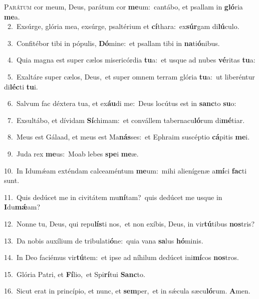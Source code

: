 \lettrine{\initial\textcolor{\initialcolor}{P}}{arátum} cor meum, Deus, parátum cor \textbf{me}\-um:~\star cantábo, et psallam in \textbf{gló}\-ria \textbf{me}\-a.\\
{\numbfont\textcolor{\numbcolor}{~2.}}~Exsúrge, glória mea, exsúrge, psaltérium et \textbf{cí}\-thara:~\star ex\-\textbf{súr}\-gam di\-\textbf{lú}\-culo.\par
{\numbfont\textcolor{\numbcolor}{~3.}}~Confitébor tibi in pópulis, \textbf{Dó}\-mine:~\star et psallam tibi in \textbf{na}\-ti\-\textbf{ó}\-nibus.\par
{\numbfont\textcolor{\numbcolor}{~4.}}~Quia magna est super cælos misericórdia \textbf{tu}\-a:~\star et usque ad nubes \textbf{vé}\-ritas \textbf{tu}\-a:\par
{\numbfont\textcolor{\numbcolor}{~5.}}~Exaltáre super cælos, Deus,~\dagger et super omnem terram glória \textbf{tu}\-a:~\star ut liberéntur di\-\textbf{léc}\-ti \textbf{tu}\-i.\par
{\numbfont\textcolor{\numbcolor}{~6.}}~Salvum fac déxtera tua, et ex\-\textbf{áu}\-di me:~\star Deus locútus est in \textbf{sanc}\-to \textbf{su}\-o:\par
{\numbfont\textcolor{\numbcolor}{~7.}}~Exsultábo, et dívidam \textbf{Sí}\-chimam:~\star et convállem tabernacu\-\textbf{ló}\-rum di\-\textbf{mé}\-tiar.\par
{\numbfont\textcolor{\numbcolor}{~8.}}~Meus est Gálaad, et meus est Ma\-\textbf{nás}\-ses:~\star et Ephraim suscéptio \textbf{cá}\-pitis \textbf{me}\-i.\par
{\numbfont\textcolor{\numbcolor}{~9.}}~Juda rex \textbf{me}\-us:~\star Moab lebes \textbf{spe}\-i \textbf{me}\-æ.\par
{\numbfont\textcolor{\numbcolor}{10.}}~In Idumǽam exténdam calceaméntum \textbf{me}\-um:~\star mihi alienígenæ a\-\textbf{mí}\-ci \textbf{fac}\-ti sunt.\par
{\numbfont\textcolor{\numbcolor}{11.}}~Quis dedúcet me in civitátem mu\-\textbf{ní}\-tam?~\star quis dedúcet me usque in \textbf{I}\-du\-\textbf{mǽ}\-am?\par
{\numbfont\textcolor{\numbcolor}{12.}}~Nonne tu, Deus, qui repu\-\textbf{lís}\-ti nos,~\star et non exíbis, Deus, in vir\-\textbf{tú}\-tibus \textbf{nos}\-tris?\par
{\numbfont\textcolor{\numbcolor}{13.}}~Da nobis auxílium de tribulati\-\textbf{ó}\-ne:~\star quia vana \textbf{sa}\-lus \textbf{hó}\-minis.\par
{\numbfont\textcolor{\numbcolor}{14.}}~In Deo faciémus vir\-\textbf{tú}\-tem:~\star et ipse ad níhilum dedúcet ini\-\textbf{mí}\-cos \textbf{nos}\-tros.\par
{\numbfont\textcolor{\numbcolor}{15.}}~Glória Patri, et \textbf{Fí}\-lio,~\star et Spi\-\textbf{rí}\-tui \textbf{Sanc}\-to.\par
{\numbfont\textcolor{\numbcolor}{16.}}~Sicut erat in princípio, et nunc, et \textbf{sem}\-per,~\star et in sǽcula sæcu\-\textbf{ló}\-rum. \textbf{A}\-men.\par

